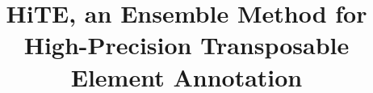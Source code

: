 \documentclass{bmcart}
\begin{document}
\begin{frontmatter}

\begin{fmbox}


\title{HiTE, an Ensemble Method for High-Precision Transposable Element Annotation}


\author[
  addressref={aff1},                   %
  email={kanghu@csu.edu.cn}   %
]{ }
\author[
  addressref={aff1},
  corref={aff1},                       %
  email={jxwang@mail.csu.edu.cn}
]{ }


\address[id=aff1]{%
  ,             %
  ,          %
  ,                              %
}



\end{fmbox}
\end{frontmatter}
\end{document}
